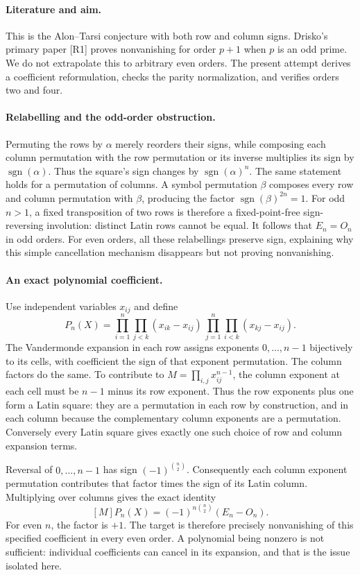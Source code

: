 \documentclass[11pt,a4paper]{article}
\begin{document}
\paragraph{Literature and aim.}
This is the Alon--Tarsi conjecture with both row and column signs.
Drisko's primary paper [R1] proves nonvanishing for order $p+1$ when
$p$ is an odd prime. We do not extrapolate this to arbitrary even
orders. The present attempt derives a coefficient reformulation,
checks the parity normalization, and verifies orders two and four.

\paragraph{Relabelling and the odd-order obstruction.}
Permuting the rows by $\alpha$ merely reorders their signs, while
composing each column permutation with the row permutation or its
inverse multiplies its sign by $\operatorname{sgn}(\alpha)$.
Thus the square's sign changes by $\operatorname{sgn}(\alpha)^n$.
The same statement holds for a permutation of columns. A symbol
permutation $\beta$ composes every row and column permutation with
$\beta$, producing the factor $\operatorname{sgn}(\beta)^{2n}=1$.
For odd $n>1$, a fixed transposition of two rows is therefore a
fixed-point-free sign-reversing involution: distinct Latin rows
cannot be equal. It follows that $E_n=O_n$ in odd orders. For even
orders, all these relabellings preserve sign, explaining why this
simple cancellation mechanism disappears but not proving nonvanishing.

\paragraph{An exact polynomial coefficient.}
Use independent variables $x_{ij}$ and define
\[
 P_n(X)=
 \prod_{i=1}^n\prod_{j<k}(x_{ik}-x_{ij})\,
 \prod_{j=1}^n\prod_{i<k}(x_{kj}-x_{ij}).
\]
The Vandermonde expansion in each row assigns exponents
$0,\ldots,n-1$ bijectively to its cells, with coefficient the sign
of that exponent permutation. The column factors do the same.
To contribute to $M=\prod_{i,j}x_{ij}^{n-1}$, the column exponent
at each cell must be $n-1$ minus its row exponent. Thus the row
exponents plus one form a Latin square: they are a permutation in
each row by construction, and in each column because the complementary
column exponents are a permutation. Conversely every Latin square
gives exactly one such choice of row and column expansion terms.

Reversal of $0,\ldots,n-1$ has sign $(-1)^{\binom n2}$.
Consequently each column exponent permutation contributes that factor
times the sign of its Latin column. Multiplying over columns gives
the exact identity
\[
 [M]P_n(X)=(-1)^{n\binom n2}(E_n-O_n).
\]
For even $n$, the factor is $+1$. The target is therefore precisely
nonvanishing of this specified coefficient in every even order. A
polynomial being nonzero is not sufficient: individual coefficients
can cancel in its expansion, and that is the issue isolated here.
\end{document}
